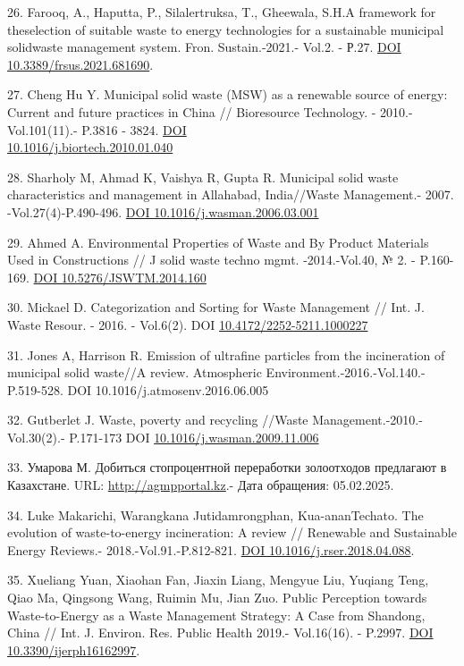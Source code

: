 \begin{references}
26. Farooq, A., Haputta, P., Silalertruksa, T., Gheewala, S.H.A
framework for theselection of suitable waste to energy technologies for
a sustainable municipal solidwaste management system. Fron.
Sustain.-2021.- Vol.2. - Р.27.
\href{https://doi.org/10.3389/frsus.2021.681690}{DOI
10.3389/frsus.2021.681690}.

27. Cheng Hu Y. Municipal solid waste (MSW) as a renewable source of
energy: Current and future practices in China // Bioresource Technology.
- 2010.-Vol.101(11).- P.3816 - 3824.
\href{https://doi.org/10.1016/j.biortech.2010.01.040}{DOI \\10.1016/j.biortech.2010.01.040}

28. Sharholy M, Ahmad K, Vaishya R, Gupta R. Municipal solid waste
characteristics and management in Allahabad, India//Waste Management.-
2007. -Vol.27(4)-P.490-496.
\href{https://doi.org/10.1016/j.wasman.2006.03.001}{DOI
10.1016/j.wasman.2006.03.001}

29. Ahmed A. Environmental Properties of Waste and By Product Materials
Used in Constructions // J solid waste techno mgmt. -2014.-Vol.40, № 2.
- P.160-169. \href{https://doi.org/10.5276/JSWTM.2014.160}{DOI
10.5276/JSWTM.2014.160}

30. Mickael D. Categorization and Sorting for Waste Management // Int.
J. Waste Resour. - 2016. - Vol.6(2). DOI
\href{http://dx.doi.org/10.4172/2252-5211.1000227}{10.4172/2252-5211.1000227}

31. Jones A, Harrison R. Emission of ultrafine particles from the
incineration of municipal solid waste//A review. Atmospheric
Environment.-2016.-Vol.140.-P.519-528.
DOI 10.1016/j.atmosenv.2016.06.005

32. Gutberlet J. Waste, poverty and recycling //Waste
Management.-2010.-Vol.30(2).- P.171-173 DOI
\href{http://dx.doi.org/10.1016/j.wasman.2009.11.006}{10.1016/j.wasman.2009.11.006}

33. Умарова М. Добиться стопроцентной переработки золоотходов
предлагают в
Казахстане. URL: \href{http://agmpportal.kz/dobitsya-stoprotsentnoj-pererabotki-zoloothodov-predlagayut-v-kazahstane\%20/}{http://agmpportal.kz}.- Дата обращения: 05.02.2025.

34. Luke Makarichi, Warangkana Jutidamrongphan, Kua-ananTechato. The
evolution of waste-to-energy incineration: A review // Renewable and
Sustainable Energy Reviews.- 2018.-Vol.91.-P.812-821.
\href{https://doi.org/10.1016/j.rser.2018.04.088}{DOI
10.1016/j.rser.2018.04.088}.

35. Xueliang Yuan, Xiaohan Fan, Jiaxin Liang, Mengyue Liu, Yuqiang Teng,
Qiao Ma, Qingsong Wang, Ruimin Mu, Jian Zuo. Public Perception towards
Waste-to-Energy as a Waste Management Strategy: A Case from Shandong,
China // Int. J. Environ. Res. Public Health 2019.- Vol.16(16). -
P.2997. \href{https://doi.org/10.3390/ijerph16162997}{DOI
10.3390/ijerph16162997}.


\end{references}
